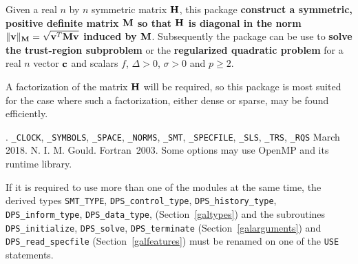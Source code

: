 \documentclass{galahad}
\newcommand{\packagename}{DPS}
\newcommand{\fullpackagename}{\libraryname\_\packagename}
\begin{document}
\galheader


\galsummary
Given a real $n$ by $n$ symmetric matrix ${\mathbf{H}}$, this package {\bf construct a
symmetric, positive definite matrix ${\mathbf{M}}$ so that ${\mathbf{H}}$
is diagonal in the norm $\|{\mathbf{v}}\|_{{\mathbf{M}}} = \sqrt{{\mathbf{v}}^T {\mathbf{M}} {\mathbf{v}}}$
induced by ${\mathbf{M}}$}. Subsequently the package can be use to
{\bf solve the trust-region subproblem}
or the {\bf regularized quadratic problem}
for a real $n$ vector ${\mathbf{c}}$ and scalars $f$, $\Delta>0$, $\sigma>0$
and $p \geq 2$.

\noindent
A factorization of the matrix ${\mathbf{H}}$ will be required, so this package is
most suited for the case where such a factorization, either dense or sparse,
may be found efficiently.


\galattributes
\galversions{\tt  \fullpackagename\_single, \fullpackagename\_double}.
\galuses
{\tt \libraryname\_CLOCK},
{\tt \libraryname\_SY\-M\-BOLS},
{\tt \libraryname\_SPACE}, {\tt \libraryname\_\-NORMS},
{\tt \libraryname\_\-SMT},
{\tt \libraryname\_\-SPECFILE},
{\tt \libraryname\_SLS}, {\tt \libraryname\_TRS},
{\tt \libraryname\_RQS}
\galdate March 2018.
\galorigin N. I. M. Gould.
\gallanguage Fortran~2003.
\galparallelism Some options may use OpenMP and its runtime library.


\galhowto



\noindent
If it is required to use more than one of the modules at the same time, 
the derived types
{\tt SMT\_TYPE},
{\tt \packagename\_control\_type},
{\tt \packagename\_history\_\-type},
{\tt \packagename\_inform\_type},
{\tt \packagename\_data\_type},
(Section~\ref{galtypes})
and the subroutines
{\tt \packagename\_initialize},
{\tt \packagename\_solve}, {\tt \packagename\_\-terminate}
(Section~\ref{galarguments})
and
{\tt \packagename\_read\_specfile}
(Section~\ref{galfeatures})
must be renamed on one of the {\tt USE} statements.

\end{document}
